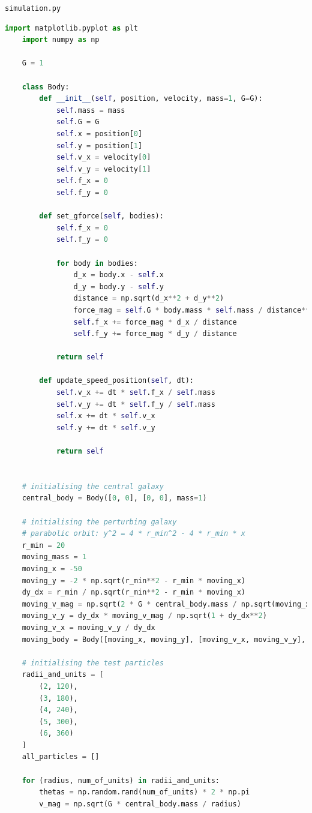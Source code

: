 \documentclass[twoside,twocolumn]{article}
\begin{document}
{\large \texttt{simulation.py}}
\begin{lstlisting}[language=Python, breaklines=true]
    import matplotlib.pyplot as plt
    import numpy as np
    
    G = 1

    class Body:
        def __init__(self, position, velocity, mass=1, G=G):
            self.mass = mass
            self.G = G
            self.x = position[0]
            self.y = position[1]
            self.v_x = velocity[0]
            self.v_y = velocity[1]
            self.f_x = 0
            self.f_y = 0

        def set_gforce(self, bodies):
            self.f_x = 0
            self.f_y = 0

            for body in bodies:
                d_x = body.x - self.x
                d_y = body.y - self.y
                distance = np.sqrt(d_x**2 + d_y**2)
                force_mag = self.G * body.mass * self.mass / distance**2
                self.f_x += force_mag * d_x / distance
                self.f_y += force_mag * d_y / distance
            
            return self

        def update_speed_position(self, dt):
            self.v_x += dt * self.f_x / self.mass
            self.v_y += dt * self.f_y / self.mass
            self.x += dt * self.v_x
            self.y += dt * self.v_y

            return self


    # initialising the central galaxy
    central_body = Body([0, 0], [0, 0], mass=1)

    # initialising the perturbing galaxy
    # parabolic orbit: y^2 = 4 * r_min^2 - 4 * r_min * x
    r_min = 20
    moving_mass = 1
    moving_x = -50
    moving_y = -2 * np.sqrt(r_min**2 - r_min * moving_x)
    dy_dx = r_min / np.sqrt(r_min**2 - r_min * moving_x)
    moving_v_mag = np.sqrt(2 * G * central_body.mass / np.sqrt(moving_x**2 + moving_y**2))
    moving_v_y = dy_dx * moving_v_mag / np.sqrt(1 + dy_dx**2)
    moving_v_x = moving_v_y / dy_dx
    moving_body = Body([moving_x, moving_y], [moving_v_x, moving_v_y], mass=1)

    # initialising the test particles
    radii_and_units = [
        (2, 120),
        (3, 180),
        (4, 240), 
        (5, 300),
        (6, 360)
    ]
    all_particles = []

    for (radius, num_of_units) in radii_and_units:
        thetas = np.random.rand(num_of_units) * 2 * np.pi
        v_mag = np.sqrt(G * central_body.mass / radius)


\end{lstlisting}
\end{document}
